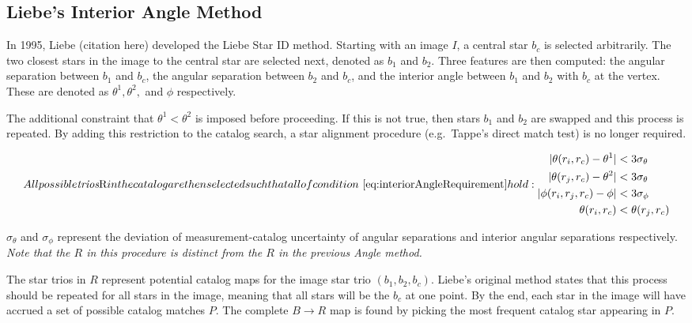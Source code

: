 \subsection{Liebe's Interior Angle Method}\label{subsec:liebe'sInteriorAngleMethod}
In 1995, Liebe (citation here) developed the Liebe Star ID method.
Starting with an image $I$, a central star $b_c$ is selected arbitrarily.
The two closest stars in the image to the central star are selected next, denoted as $b_1$ and $b_2$.
Three features are then computed: the angular separation between $b_1$ and $b_c$, the angular separation between
$b_2$ and $b_c$, and the interior angle between $b_1$ and $b_2$ with $b_c$ at the vertex.
These are denoted as $\theta^1, \theta^2,$ and $\phi$ respectively.

The additional constraint that $\theta^1 < \theta^2$ is imposed before proceeding.
If this is not true, then stars $b_1$ and $b_2$ are swapped and this process is repeated.
By adding this restriction to the catalog search, a star alignment procedure (e.g.\ Tappe's direct match test) is no
longer required.

\begin{subequations}
    \label{eq:interiorAngleRequirement}

    All possible \textit{trios} $R$ in the catalog are then selected such that all of
    condition~\eqref{eq:interiorAngleRequirement} hold:
    \begin{align}
        |\theta(r_i, r_c) - \theta^1| &< 3 \sigma_{\theta} \\
        |\theta(r_j, r_c) - \theta^2| &< 3 \sigma_{\theta} \\
        |\phi(r_i, r_j, r_c) - \phi| &< 3 \sigma_{\phi} \\
        \theta(r_i, r_c) &< \theta(r_j, r_c)
    \end{align}
\end{subequations}

$\sigma_{\theta}$ and $\sigma_{\phi}$ represent the deviation of measurement-catalog uncertainty of angular separations
and interior angular separations respectively.
\textit{Note that the $R$ in this procedure is distinct from the $R$ in the previous Angle method.}

The star trios in $R$ represent potential catalog maps for the image star trio $(b_1, b_2, b_c)$.
Liebe's original method states that this process should be repeated for all stars in the image, meaning that all
stars will be the $b_c$ at one point.
By the end, each star in the image will have accrued a set of possible catalog matches $P$.
The complete $B \rightarrow R$ map is found by picking the most frequent catalog star appearing in $P$.

